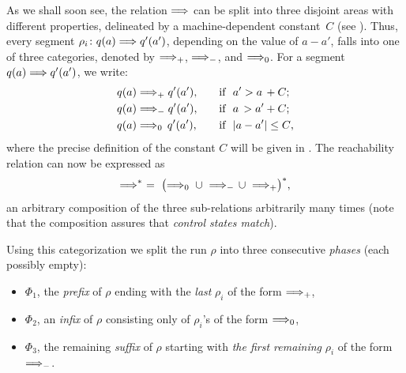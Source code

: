 \vspace{-2mm}


As we shall soon see, the relation $\Longrightarrow$
can be split into three disjoint areas with different properties,
delineated by a machine-dependent constant~$C$
(see ).
Thus, every segment $\rho_i \colon q(a) \Longrightarrow q'(a')$, 
depending on the value of $a-a'$,
falls into one of three categories,
denoted by $\Longrightarrow_{+}$, $\Longrightarrow_{-}$, and $\Longrightarrow_{0}$.
For a segment $q(a) \Longrightarrow q'(a')$, we write:
\begin{equation}
\begin{aligned}\label{eq:tran0-+}
& q(a) \Longrightarrow_{+} q'(a'),\quad && 
\text{if\ \ $a' > a\,+C${}};\\
& q(a) \Longrightarrow_{-} q'(a'),\quad && 
\text{if\ \ $a\, > a'+C${}};\\
& q(a) \Longrightarrow_{0}\, q'(a'),\quad && 
\text{if\ \ $|a-a'|\leq C $},
\end{aligned}
\end{equation}
% 
where the precise definition of the constant $C$ will be given in .
The reachability relation can now be expressed as
\[
\reachrel^* \ = \ 
\big({\stepp 0} \ \cup \ {\stepp -} \,\cup \ {\stepp +} \big)^*,
\] 
an arbitrary composition
of the three sub-relations arbitrarily many times
(note that the composition assures that \emph{control states match}).

Using this categorization 
we split the run $\rho$ into three consecutive \emph{phases} (each possibly empty): 

\begin{itemize}
\item $\Phi_1$, the \emph{prefix} of $\rho$ ending with the \emph{last} $\rho_i$ of the form $\Longrightarrow_{+}$,
\item $\Phi_2$, an \emph{infix} of $\rho$ consisting only of $\rho_i$'s of the form $\Longrightarrow_{0}$, 
\item $\Phi_3$, the remaining \emph{suffix} of $\rho$ starting 
with \emph{the first remaining} $\rho_i$ of the form $\Longrightarrow_{-}$.
\end{itemize}

